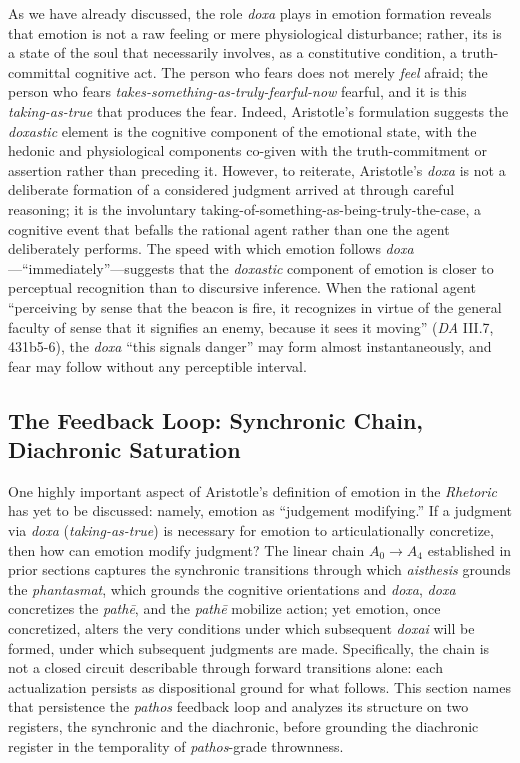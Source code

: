 \documentclass{article}
\begin{document}
As we have already discussed, the role \textit{doxa} plays in emotion formation reveals that emotion is not a raw feeling or mere physiological disturbance; rather, its is a state of the soul that necessarily involves, as a constitutive condition, a truth-committal cognitive act. The  person who fears does not merely \textit{feel} afraid; the person who fears \textit{takes-something-as-truly-fearful-now} fearful, and it is this \textit{taking-as-true} that produces the fear. Indeed, Aristotle's formulation suggests the \textit{doxastic} element is the cognitive component of the emotional state, with the hedonic and physiological components co-given with the truth-commitment or assertion rather than preceding it. However, to reiterate, Aristotle's \textit{doxa} is not a deliberate formation of a considered judgment arrived at through careful reasoning; it is the involuntary taking-of-something-as-being-truly-the-case, a cognitive event that befalls the rational agent rather than one the agent deliberately performs. The speed with which emotion follows \textit{doxa}---``immediately''---suggests that the \textit{doxastic} component of emotion is closer to perceptual recognition than to discursive inference. When the rational agent ``perceiving by sense that the beacon is fire, it recognizes in virtue of the general faculty of sense that it signifies an enemy, because it sees it moving'' (\textit{DA} III.7, 431b5-6), the \textit{doxa} ``this signals danger'' may form almost instantaneously, and fear may follow without any perceptible interval. 

\subsection{The Feedback Loop: Synchronic Chain, Diachronic Saturation}

One highly important aspect of Aristotle's definition of emotion in the \textit{Rhetoric} has yet to be discussed: namely, emotion as ``judgement modifying.'' If a judgment via \textit{doxa} (\textit{taking-as-true}) is necessary for emotion to articulationally concretize, then how can emotion modify judgment? The linear chain $A_0 \rightarrow A_4$ established in prior sections captures the synchronic transitions through which \textit{aisthesis} grounds the \textit{phantasmat}, which grounds the  cognitive orientations and \textit{doxa}, \textit{doxa} concretizes the \textit{path\=e}, and the \textit{path\=e} mobilize action; yet emotion, once concretized, alters the very conditions under which subsequent \textit{doxai} will be formed, under which subsequent judgments are made. Specifically, the chain is not a closed circuit describable through forward transitions alone: each actualization persists as dispositional ground for what follows. This section names that persistence the \textit{pathos} feedback loop and analyzes its structure on two registers, the synchronic and the diachronic, before grounding the diachronic register in the temporality of \textit{pathos}-grade thrownness.
\end{document}
